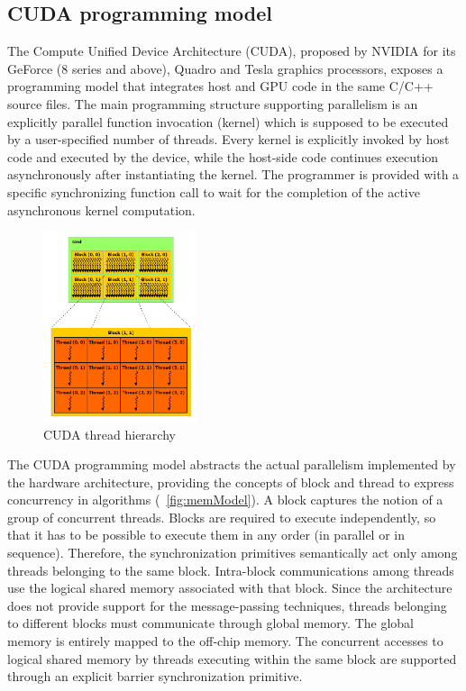 \subsection{CUDA programming model}
   The Compute Unified Device Architecture (CUDA), proposed by NVIDIA for its GeForce (8 series and above), Quadro and Tesla
graphics processors, exposes a programming model that integrates host and GPU code in the same C/C++ source files.\newline
The main programming structure supporting parallelism is an explicitly parallel function invocation (kernel) which
is supposed to be executed by a user-specified number of threads.
Every kernel is explicitly invoked by host code and executed by the device, while the host-side code continues execution
 asynchronously after instantiating the kernel. The programmer is provided with a specific synchronizing function call
to wait for the completion of the active asynchronous kernel computation.\newline
\begin{figure}[h!tp]
    \centering
     \includegraphics[width=0.4\textwidth]{./img/threadHierarchy}
\caption{CUDA thread hierarchy}\label{fig:threadHier}
    \end{figure}
   The CUDA programming model abstracts the actual parallelism implemented by the hardware architecture,
providing the concepts of block and thread to express concurrency in algorithms (\figurename~\ref{fig:memModel}).
A block captures the notion of a group of concurrent threads. Blocks are required to execute independently, so that it has
to be possible to execute them in any order (in parallel or in sequence). Therefore, the synchronization primitives semantically
act only among threads belonging to the same block.
Intra-block communications among threads use the logical shared memory associated with that block.\newline
   Since the architecture does not provide support for the message-passing techniques, threads belonging
to different blocks must communicate through global memory. The global memory is entirely mapped to the off-chip memory.
The concurrent accesses to logical shared memory by threads executing within the same block are supported through an explicit
barrier synchronization primitive.\newline

